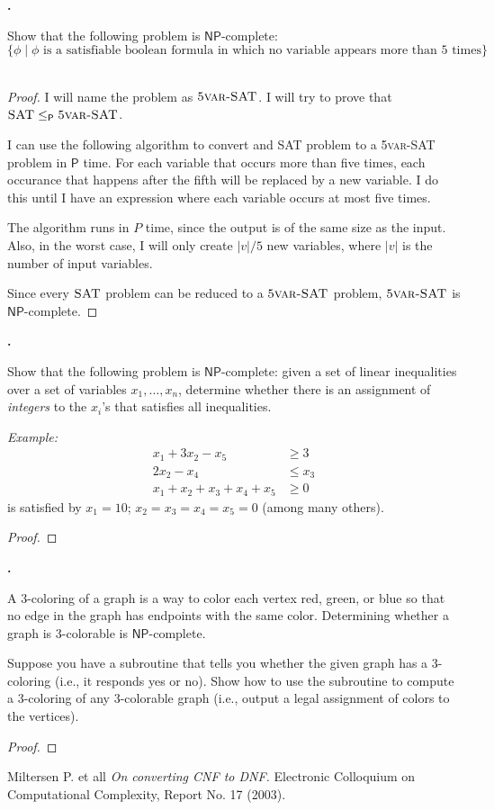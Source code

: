 \documentclass[letterpaper,11pt]{article}
\newcommand{\cc}[1]{\ensuremath{\textsf{#1}}\xspace}
\renewcommand{\P}{\cc{P}}
\newcommand{\NP}{\cc{NP}}
\newcommand{\karp}{\le_{\textsf{P}}}
\newcounter{problem}
\newenvironment{problem}%
{%
	\stepcounter{problem}%
	\textbf{\theproblem.}
	\large
}{\\}%
\begin{document}
\begin{problem}
Show that the following problem is \NP-complete:
\[
    \{ \phi \mid \phi \mbox{ is a satisfiable boolean formula in which no variable appears more than 5 times}\}
\]
\end{problem}

\begin{proof}
I will name the problem as $\textsc{5var-SAT}$.
I will try to prove that $\textsc{SAT} \karp \textsc{5var-SAT}$.

I can use the following algorithm to convert and \textsc{SAT} problem to a \textsc{5var-SAT} problem in $\P$ time.
For each variable that occurs more than five times, each occurance that happens after the fifth will be replaced by a new variable.
I do this until I have an expression where each variable occurs at most five times.

The algorithm runs in $P$ time, since the output is of the same size as the input.
Also, in the worst case, I will only create $|v| / 5$ new variables, where $|v|$ is the number of input variables.

Since every $\textsc{SAT}$ problem can be reduced to a $\textsc{5var-SAT}$ problem, $\textsc{5var-SAT}$ is $\NP$-complete.
\end{proof}

\begin{problem}
Show that the following problem is \NP-complete: given a set of linear inequalities over a set of variables $x_1, \ldots, x_n$, determine whether there is an assignment of {\em integers} to the $x_i$'s that satisfies all inequalities.

{\em Example:}
\begin{align*}
    x_1 + 3x_2 - x_5 &\ge 3 \\
    2x_2 - x_4 &\le x_3 \\
    x_1 + x_2 + x_3 + x_4 + x_5 &\ge 0
\end{align*}
is satisfied by $x_1 = 10$; $x_2 = x_3 = x_4 = x_5 = 0$ (among many others).
\end{problem}

\begin{proof}
\end{proof}

\begin{problem}
A 3-coloring of a graph is a way to color each vertex red, green, or blue so that no edge in the graph has endpoints with the same color. Determining whether a graph is 3-colorable is \NP-complete.

Suppose you have a subroutine that tells you whether the given graph has a 3-coloring (i.e., it responds {\sc yes} or {\sc no}). Show how to use the subroutine to compute a 3-coloring of any 3-colorable graph (i.e., output a legal assignment of colors to the vertices).
\end{problem}

\begin{proof}
\end{proof}

\begin{thebibliography}{1}

 Miltersen P. et all {\em On converting CNF to DNF.} Electronic Colloquium on Computational Complexity, Report No. 17 (2003).

\end{thebibliography}
\end{document}
